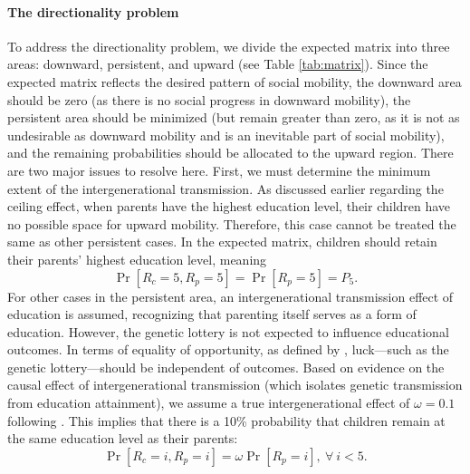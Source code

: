 \paragraph{The directionality problem}
To address the directionality problem, we divide the expected matrix into three areas: downward, persistent, and upward (see Table \ref{tab:matrix}). Since the expected matrix reflects the desired pattern of social mobility, the downward area should be zero (as there is no social progress in downward mobility), the persistent area should be minimized (but remain greater than zero, as it is not as undesirable as downward mobility and is an inevitable part of social mobility), and the remaining probabilities should be allocated to the upward region. There are two major issues to resolve here. First, we must determine the minimum extent of the intergenerational transmission. As discussed earlier regarding the ceiling effect, when parents have the highest education level, their children have no possible space for upward mobility. Therefore, this case cannot be treated the same as other persistent cases. In the expected matrix, children should retain their parents' highest education level, meaning  
\[
\operatorname{Pr}[R_c=5, R_p=5]=\operatorname{Pr}[R_p=5]=P_5.
\]
For other cases in the persistent area, an intergenerational transmission effect of education is assumed, recognizing that parenting itself serves as a form of education. However, the genetic lottery is not expected to influence educational outcomes. In terms of equality of opportunity, as defined by \citet{roemer2015equality}, luck---such as the genetic lottery---should be independent of outcomes. Based on evidence on the causal effect of intergenerational transmission (which isolates genetic transmission from education attainment), we assume a true intergenerational effect of \(\omega=0.1\) following \citet{holmlund2011causal}. This implies that there is a 10\% probability that children remain at the same education level as their parents:  
\[
\operatorname{Pr}[ R_{c} =i, R_{p} =i] =\omega \operatorname{Pr}[ R_{p} =i],\ \forall \ i< 5.
\]

